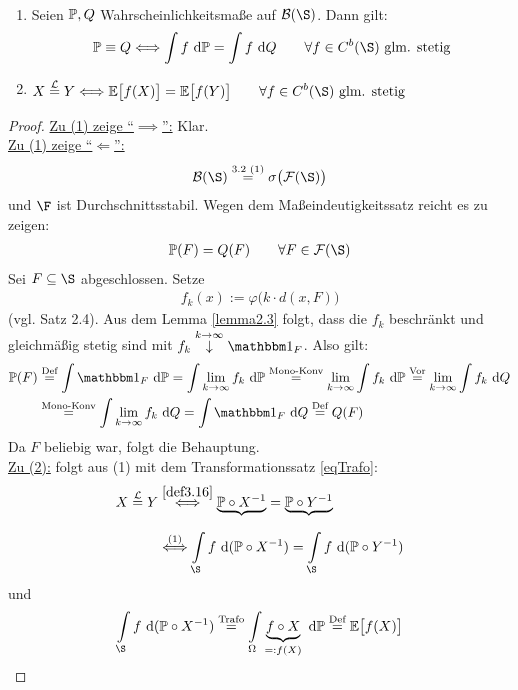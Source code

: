 \begin{satz}\label{satz3.17}\
\begin{enumerate}[label=(\arabic*)]
\item Seien $\P,Q$ Wahrscheinlichkeitsmaße auf $\B(\S)$. Dann gilt:
\begin{align*}
\P\equiv Q\Longleftrightarrow
\int\limits f\d\P=\int\limits f\d Q\qquad\forall f\in C^b(\S)\text{ glm. stetig}
\end{align*}
\item $\begin{aligned}
X\stackeq{\mathcal{L}} Y\Longleftrightarrow
\E\big[f(X)\big]=\E\big[f(Y)\big]\qquad\forall f\in C^b(\S)\text{ glm. stetig}
\end{aligned}$
\end{enumerate}
\end{satz}
\begin{proof}
\underline{Zu (1) zeige ``$\implies$'':} Klar.\\

\underline{Zu (1) zeige ``$\Longleftarrow$'':}
\begin{align*}
\B(\S)\stackeq{\text{3.2 (1)}}\sigma\big(\mathcal{F}(\S)\big)
\end{align*}
und $\F$ ist Durchschnittsstabil. Wegen dem Maßeindeutigkeitssatz reicht es zu zeigen:
\begin{align*}
\P(F)=Q(F)\qquad\forall F\in\mathcal{F}(\S)
\end{align*}
Sei $F\subseteq\S$ abgeschlossen. Setze
\begin{align*}
f_k(x):=\varphi\Big(k\cdot d(x,F)\Big)
\end{align*}
(vgl. Satz 2.4). Aus dem Lemma \ref{lemma2.3} folgt, dass die $f_k$ beschränkt und gleichmäßig stetig sind mit $f_k\stackrel{k\to\infty}{\downarrow}\indi_F$. Also gilt:
\begin{align*}
\P(F)
&\stackeq{\text{Def}}
\int\limits\indi_F\d\P
=\int\limits\lim\limits_{k\to\infty} f_k\d\P
\stackeq{\text{Mono-Konv}}
\lim\limits_{k\to\infty}\int\limits f_k\d\P
\stackeq{\text{Vor}}
\lim\limits_{k\to\infty}\int\limits f_k\d Q\\
&\stackeq{\text{Mono-Konv}}
\int\limits\lim\limits_{k\to\infty} f_k\d Q
=\int\limits\indi_F\d Q
\stackeq{\text{Def}} Q(F)
\end{align*}
Da $F$ beliebig war, folgt die Behauptung.\\

\underline{Zu (2):} folgt aus (1) mit dem Transformationssatz \eqref{eqTrafo}:
\begin{align*}
X\stackeq{\mathcal{L}} Y
&\stackrel{\ref{def3.16}}{\Longleftrightarrow}
\underbrace{\P\circ X^{-1}}_{}=\underbrace{\P\circ Y^{-1}}_{}\\
&\stackrel{(1)}{\Longleftrightarrow}
\int\limits_{\S} f\d(\P\circ X^{-1})=\int\limits_{\S} f\d(\P\circ Y^{-1})
\end{align*}
und
\begin{align*}
\int\limits_{\S} f\d(\P\circ X^{-1})
\stackeq{\text{Trafo}}
\int\limits_{\Omega}\underbrace{f\circ X}_{=:f(X)}\d\P
\stackeq{\text{Def}}
\E\big[f(X)\big]
\end{align*}
\end{proof}

